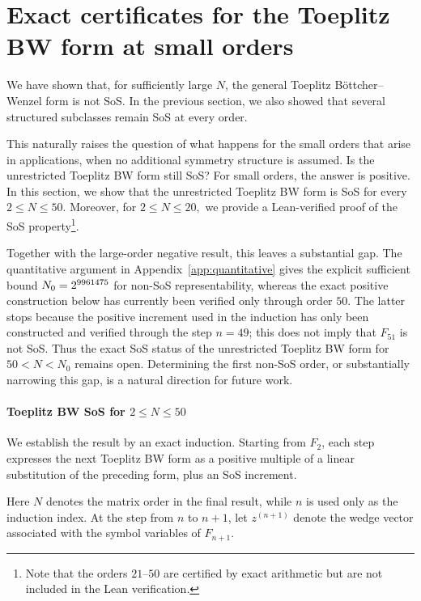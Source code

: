 \section{Exact certificates for the Toeplitz BW form at small orders}
\label{sec:exact-certificates}

We have shown that, for sufficiently large $N$, the general Toeplitz
B\"ottcher--Wenzel form is not SoS.  In the previous section, we also
showed that several structured subclasses remain SoS at every order.

This naturally raises the question of what happens for the small orders
that arise in applications, when no additional symmetry structure is
assumed.  Is the unrestricted Toeplitz BW form still SoS?
For small orders, the answer is positive.  In this section, we show
that the unrestricted Toeplitz BW form is SoS for every
$
2\le N\le50.
$
Moreover, for
$
2\le N\le20,
$
we provide a Lean-verified proof of the SoS property\footnote{Note that the orders $21$--$50$ are certified by exact arithmetic but are
not included in the Lean verification.}.

Together with the large-order negative result, this leaves a substantial
gap.  The quantitative argument in Appendix~\ref{app:quantitative}
gives the explicit sufficient bound
$
N_0=2^{9961475}
$
for non-SoS representability, whereas the exact positive construction
below has currently been verified only through order $50$.  The latter
stops because the positive increment used in the induction has only
been constructed and verified through the step $n=49$; this does not
imply that $F_{51}$ is not SoS.  Thus the exact SoS status of the
unrestricted Toeplitz BW form for
$
50<N<N_0
$
remains open.  Determining the first non-SoS order, or substantially
narrowing this gap, is a natural direction for future work.

\paragraph{Toeplitz BW SoS for $2\le N\le50$}\label{subsec:certificate-chain}
We establish the result by an exact induction. Starting from $F_2$,
each step expresses the next Toeplitz BW form as a positive multiple
of a linear substitution of the preceding form, plus an SoS increment.

Here $N$ denotes the matrix order in the final result, while $n$ is
used only as the induction index. At the step from $n$ to $n+1$, let
$z^{(n+1)}$ denote the wedge vector associated with the symbol variables
of $F_{n+1}$.

